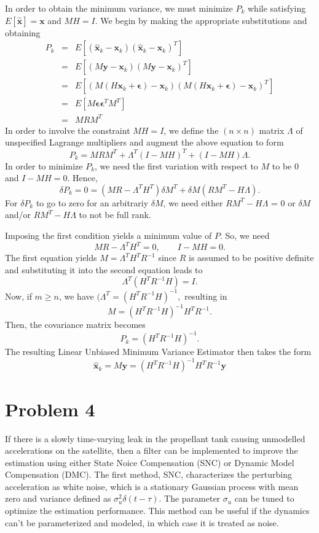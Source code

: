 \documentclass[11pt]{article}
\begin{document}
In order to obtain the minimum variance, we must minimize $P_k$ while satisfying $E [\hat{\mathbf{x}} ] = \textbf{x}$ and $MH=I$.  We begin by making the appropriate substitutions and obtaining
\begin{eqnarray*}
P_k &=& E \left[ ( \hat{\mathbf{x}}_k - \mathbf{x}_k )( \hat{\mathbf{x}}_k - \mathbf{x}_k )^T  \right]\\
&=& E[(M\mathbf{y}- \mathbf{x}_k)(M\mathbf{y} - \mathbf{x}_k)^T]\\
&=& E[(M(H\mathbf{x}_k + \mathbf{\epsilon}) - \mathbf{x}_k)(M(H\mathbf{x}_k + \mathbf{\epsilon}) - \mathbf{x}_k)^T]\\
&=& E[M \mathbf{\epsilon} \mathbf{\epsilon}^T M^T]\\
&=&  MRM^T
\end{eqnarray*}
In order to involve the constraint $MH=I$, we define the $(n \times n)$ matrix $\Lambda$ of unspecified Lagrange multipliers and augment the above equation to form
\[ P_k = MRM^T + \Lambda^T (I-MH)^T + (I-MH)\Lambda.\]
In order to minimize $P_k$, we need the first variation with respect to $M$ to be 0 and $I-MH=0$.  Hence,
\[\delta P_k = 0 = (MR - \Lambda^T H^T)\delta M^T + \delta M (RM^T - H\Lambda).\]
For $\delta P_k$ to go to zero for an arbitrariy $\delta M$, we need either $RM^T - H\Lambda$ = 0 or $\delta M$ and/or $RM^T - H\Lambda$ to not be full rank.   

Imposing the first condition yields a minimum value of $P$.  So, we need
\[MR-\Lambda^T H^T = 0, \qquad I-MH=0.\]
The first equation yields $M=\Lambda^T H^T R^{-1}$ since $R$ is assumed to be positive definite and substituting it into the second equation leads to
\[\Lambda^T \left( H^T R^{-1} H \right) = I.\]
Now, if $m \geq n$, we have $(\Lambda^T = \left( H^T R^{-1} H \right)^{-1},$ resulting in
\[ M = \left( H^TR^{-1}H \right)^{-1}H^TR^{-1}. \]
Then, the covariance matrix becomes
\[P_k = \left( H^T R^{-1} H \right)^{-1}. \]
The resulting Linear Unbiased Minimum Variance Estimator then takes the form
\[ \hat{\mathbf{x}}_k = M\mathbf{y} = (H^TR^{-1}H)^{-1}H^TR^{-1}\mathbf{y} \]


\newpage

\section*{Problem 4}

If there is a slowly time-varying leak in the propellant tank causing unmodelled accelerations on the satellite, then a filter can be implemented to improve the estimation using either State Noice Compensation (SNC) or Dynamic Model Compensation (DMC).  The first method, SNC, characterizes the perturbing acceleration as white noise, which is a stationary Gaussian process with mean zero and variance defined as $\sigma^2_u \delta (t-\tau)$.  The parameter $\sigma_u$ can be tuned to optimize the estimation performance.  This method can be useful if the dynamics can't be parameterized and modeled, in which case it is treated as noise.
\end{document}
